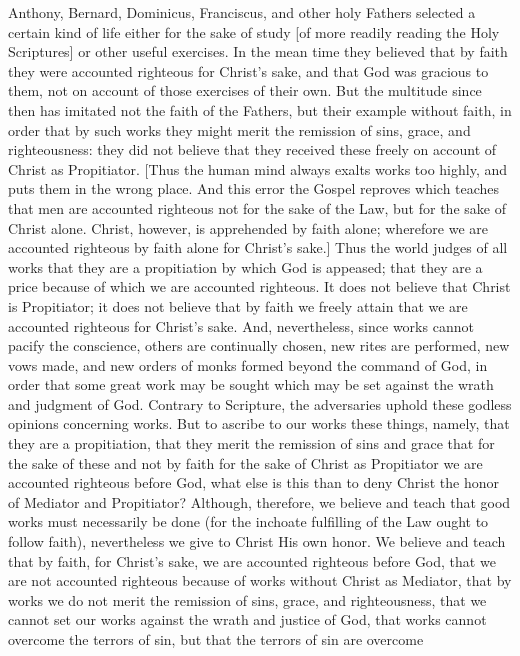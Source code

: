 Anthony, Bernard, Dominicus, Franciscus, and other holy Fathers
selected a certain kind of life either for the sake of study [of more
readily reading the Holy Scriptures] or other useful exercises.  In
the mean time they believed that by faith they were accounted
righteous for Christ's sake, and that God was gracious to them, not
on account of those exercises of their own.  But the multitude since
then has imitated not the faith of the Fathers, but their example
without faith, in order that by such works they might merit the
remission of sins, grace, and righteousness: they did not believe
that they received these freely on account of Christ as Propitiator.
[Thus the human mind always exalts works too highly, and puts them in
the wrong place.  And this error the Gospel reproves which teaches
that men are accounted righteous not for the sake of the Law, but for
the sake of Christ alone.  Christ, however, is apprehended by faith
alone; wherefore we are accounted righteous by faith alone for
Christ's sake.] Thus the world judges of all works that they are a
propitiation by which God is appeased; that they are a price because
of which we are accounted righteous.  It does not believe that Christ
is Propitiator; it does not believe that by faith we freely attain
that we are accounted righteous for Christ's sake.  And, nevertheless,
since works cannot pacify the conscience, others are continually
chosen, new rites are performed, new vows made, and new orders of
monks formed beyond the command of God, in order that some great work
may be sought which may be set against the wrath and judgment of God.
Contrary to Scripture, the adversaries uphold these godless opinions
concerning works.  But to ascribe to our works these things, namely,
that they are a propitiation, that they merit the remission of sins
and grace that for the sake of these and not by faith for the sake of
Christ as Propitiator we are accounted righteous before God, what
else is this than to deny Christ the honor of Mediator and
Propitiator?  Although, therefore, we believe and teach that good
works must necessarily be done (for the inchoate fulfilling of the
Law ought to follow faith), nevertheless we give to Christ His own
honor.  We believe and teach that by faith, for Christ's sake, we are
accounted righteous before God, that we are not accounted righteous
because of works without Christ as Mediator, that by works we do not
merit the remission of sins, grace, and righteousness, that we cannot
set our works against the wrath and justice of God, that works cannot
overcome the terrors of sin, but that the terrors of sin are overcome

